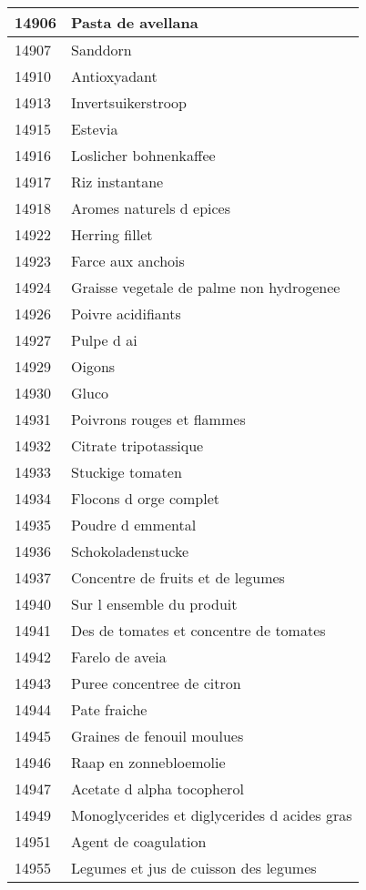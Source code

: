 \begin{longtable}{|l|l|}
14906 & Pasta de avellana \\ \hline 
14907 & Sanddorn \\ \hline 
14910 & Antioxyadant \\ \hline 
14913 & Invertsuikerstroop \\ \hline 
14915 & Estevia \\ \hline 
14916 & Loslicher bohnenkaffee \\ \hline 
14917 & Riz instantane \\ \hline 
14918 & Aromes naturels d epices \\ \hline 
14922 & Herring fillet \\ \hline 
14923 & Farce aux anchois \\ \hline 
14924 & Graisse vegetale de palme non hydrogenee \\ \hline 
14926 & Poivre acidifiants \\ \hline 
14927 & Pulpe d ai \\ \hline 
14929 & Oigons \\ \hline 
14930 & Gluco \\ \hline 
14931 & Poivrons rouges et flammes \\ \hline 
14932 & Citrate tripotassique \\ \hline 
14933 & Stuckige tomaten \\ \hline 
14934 & Flocons d orge complet \\ \hline 
14935 & Poudre d emmental \\ \hline 
14936 & Schokoladenstucke \\ \hline 
14937 & Concentre de fruits et de legumes \\ \hline 
14940 & Sur l ensemble du produit \\ \hline 
14941 & Des de tomates et concentre de tomates \\ \hline 
14942 & Farelo de aveia \\ \hline 
14943 & Puree concentree de citron \\ \hline 
14944 & Pate fraiche \\ \hline 
14945 & Graines de fenouil moulues \\ \hline 
14946 & Raap en zonnebloemolie \\ \hline 
14947 & Acetate d alpha tocopherol \\ \hline 
14949 & Monoglycerides et diglycerides d acides gras \\ \hline 
14951 & Agent de coagulation \\ \hline 
14955 & Legumes et jus de cuisson des legumes \\ \hline 

\end{longtable}
